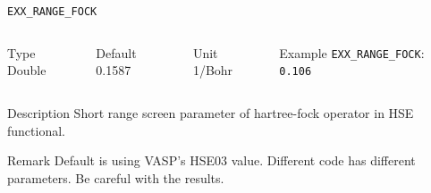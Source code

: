 \begin{frame}[allowframebreaks]{\texttt{EXX\_RANGE\_FOCK}} \label{EXX_RANGE_FOCK}
\vspace*{-12pt}
\begin{columns}
\begin{block}{Type}
Double
\end{block}

\begin{block}{Default}
0.1587
\end{block}

\begin{block}{Unit}
1/Bohr
\end{block}

\begin{block}{Example}
\texttt{EXX\_RANGE\_FOCK}: \texttt{0.106}
\end{block}
\end{columns}

\begin{block}{Description}
Short range screen parameter of hartree-fock operator in HSE functional. 
\end{block}

\begin{block}{Remark}
Default is using VASP's HSE03 value. Different code has different parameters. Be careful with the results. 
\end{block}

\end{frame}


